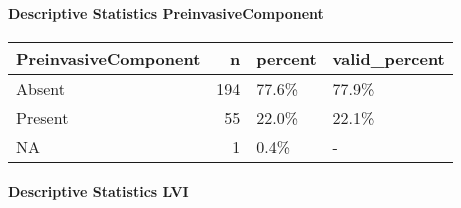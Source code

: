 \documentclass[
]{article}
\newenvironment{Shaded}{\begin{snugshade}}{\end{snugshade}}
\newcommand{\DataTypeTok}[1]{\textcolor[rgb]{0.00,0.34,0.68}{#1}}
\newcommand{\DecValTok}[1]{\textcolor[rgb]{0.69,0.50,0.00}{#1}}
\newcommand{\KeywordTok}[1]{\textcolor[rgb]{0.12,0.11,0.11}{\textbf{#1}}}
\newcommand{\NormalTok}[1]{\textcolor[rgb]{0.12,0.11,0.11}{#1}}
\newcommand{\OperatorTok}[1]{\textcolor[rgb]{0.12,0.11,0.11}{#1}}
\newcommand{\StringTok}[1]{\textcolor[rgb]{0.75,0.01,0.01}{#1}}
\begin{document}
\pagebreak

\hypertarget{descriptive-statistics-preinvasivecomponent}{%
\paragraph{Descriptive Statistics
PreinvasiveComponent}\label{descriptive-statistics-preinvasivecomponent}}

\begin{Shaded}
\end{Shaded}

\begin{longtable}[]{@{}lrll@{}}
\toprule
PreinvasiveComponent & n & percent & valid\_percent\tabularnewline
\midrule
\endhead
Absent & 194 & 77.6\% & 77.9\%\tabularnewline
Present & 55 & 22.0\% & 22.1\%\tabularnewline
NA & 1 & 0.4\% & -\tabularnewline
\bottomrule
\end{longtable}

\pagebreak

\hypertarget{descriptive-statistics-lvi}{%
\paragraph{Descriptive Statistics
LVI}\label{descriptive-statistics-lvi}}

\begin{Shaded}
\end{Shaded}
\end{document}
